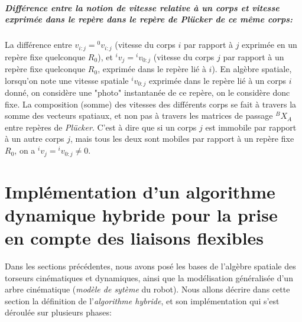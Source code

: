 \documentclass{report}
\begin{document}
\paragraph*{Différence entre la notion de vitesse relative à un corps et vitesse exprimée dans le repère dans le repère de \emph{Plücker} de ce même corps:} La différence entre $v_{i:j} = {^0v_{i:j}}$ (vitesse du corps $i$ par rapport à $j$ exprimée en un repère fixe quelconque $R_0$), et $^iv_j = {^iv_{0:j}}$ (vitesse du corps $j$ par rapport à un repère fixe quelconque $R_0$, exprimée dans le repère lié à $i$).
En algèbre spatiale, lorsqu'on note une vitesse spatiale ${^iv_{0:j}}$ exprimée dans le repère lié à un corps $i$ donné, on considère une "photo" instantanée de ce repère, on le considère donc fixe. La composition (somme) des vitesses des différents corps se fait à travers la somme des vecteurs spatiaux, et non pas à travers les matrices de passage $^BX_A$ entre repères de \emph{Plücker}. C'est à dire que si un corps $j$ est immobile par rapport à un autre corps $j$, mais tous les deux sont mobiles par rapport à un repère fixe $R_0$, on a ${^iv_j } = {^iv_{0:j}} \neq 0$.




\chapter{Implémentation d'un algorithme dynamique hybride pour la prise en compte des liaisons flexibles} \label{ch_impl}


Dans les sections précédentes, nous avons posé les bases de l'algèbre spatiale des torseurs cinématiques et dynamiques, ainsi que la modélisation généralisée d'un arbre cinématique (\emph{modèle de sytème} du robot). Nous allons décrire dans cette section la définition de l'\emph{algorithme hybride}, et son implémentation qui s'est déroulée sur plusieurs phases:\\
\end{document}
